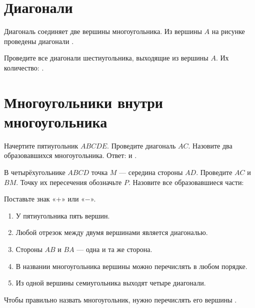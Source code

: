 \section{Диагонали}

\diagonalfigure

\begin{fillbox}[Дополните]
  Диагональ соединяет две \answerblank[34mm] вершины многоугольника.
  Из вершины \(A\) на рисунке проведены диагонали
  \answerblank[65mm].
\end{fillbox}

\clearpage
\begin{practicebox}
  Проведите все диагонали шестиугольника, выходящие из вершины \(A\).
  \hexagondiagonalsstudent
  Их количество: \answerblank[20mm].
\end{practicebox}

\section{Многоугольники внутри многоугольника}

\begin{practicebox}
  Начертите пятиугольник \(ABCDE\). Проведите диагональ \(AC\). Назовите
  два образовавшихся многоугольника.
  \studentblankpentagon
  Ответ: \answerblank[55mm] и \answerblank[65mm].
\end{practicebox}

\clearpage
\begin{thinkbox}
  В четырёхугольнике \(ABCD\) точка \(M\) --- середина стороны \(AD\).
  Проведите \(AC\) и \(BM\). Точку их пересечения обозначьте \(P\).
  \studentquadrilateralfigure
  Назовите все образовавшиеся части:
\end{thinkbox}

\begin{checkpointbox}
  Поставьте знак «+» или «−».
  \begin{enumerate}[label=\alph*),itemsep=0.5em]
    \item У пятиугольника пять вершин. \answerblank[12mm]
    \item Любой отрезок между двумя вершинами является диагональю. \answerblank[12mm]
    \item Стороны \(AB\) и \(BA\) --- одна и та же сторона. \answerblank[12mm]
    \item В названии многоугольника вершины можно перечислять в любом порядке.
      \answerblank[12mm]
    \item Из одной вершины семиугольника выходят четыре диагонали.
      \answerblank[12mm]
  \end{enumerate}
\end{checkpointbox}

\begin{reflectionbox}[Итог]
  Чтобы правильно назвать многоугольник, нужно перечислять его вершины
  \answerblank[85mm].
\end{reflectionbox}
